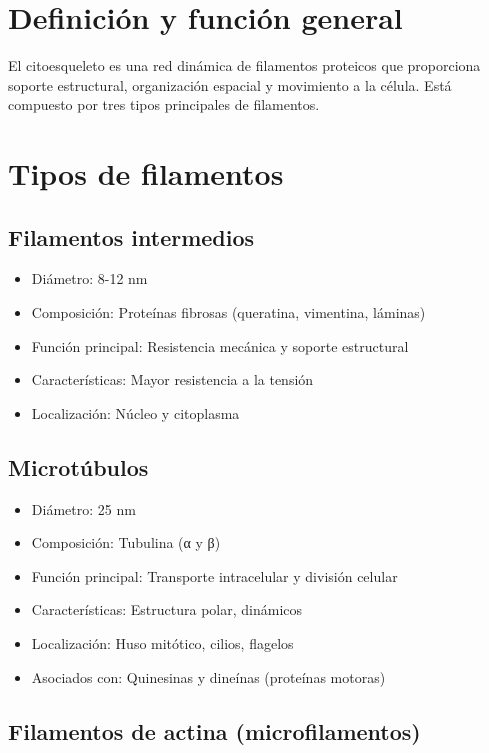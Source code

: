 \section{Definición y función general}

El citoesqueleto es una red dinámica de filamentos proteicos que proporciona soporte estructural, organización espacial y movimiento a la célula. Está compuesto por tres tipos principales de filamentos.

\section{Tipos de filamentos}

\subsection{Filamentos intermedios}

\begin{itemize}
    \item Diámetro: 8-12 nm
    \item Composición: Proteínas fibrosas (queratina, vimentina, láminas)
    \item Función principal: Resistencia mecánica y soporte estructural
    \item Características: Mayor resistencia a la tensión
    \item Localización: Núcleo y citoplasma
\end{itemize}

\subsection{Microtúbulos}

\begin{itemize}
    \item Diámetro: 25 nm
    \item Composición: Tubulina (α y β)
    \item Función principal: Transporte intracelular y división celular
    \item Características: Estructura polar, dinámicos
    \item Localización: Huso mitótico, cilios, flagelos
    \item Asociados con: Quinesinas y dineínas (proteínas motoras)
\end{itemize}

\subsection{Filamentos de actina (microfilamentos)}

